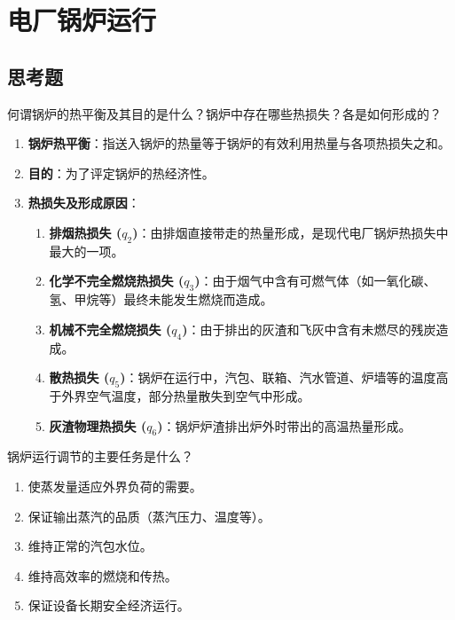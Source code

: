 \chapter{电厂锅炉运行}

\section{思考题}

\begin{problem}
何谓锅炉的热平衡及其目的是什么？锅炉中存在哪些热损失？各是如何形成的？
\end{problem}

\begin{solution}
\begin{enumerate}
  \item \textbf{锅炉热平衡}：指送入锅炉的热量等于锅炉的有效利用热量与各项热损失之和。
  \item \textbf{目的}：为了评定锅炉的热经济性。
  \item \textbf{热损失及形成原因}：
  \begin{enumerate}
    \item \textbf{排烟热损失 (\(q_{2}\))}：由排烟直接带走的热量形成，是现代电厂锅炉热损失中最大的一项。
    \item \textbf{化学不完全燃烧热损失 (\(q_{3}\))}：由于烟气中含有可燃气体（如一氧化碳、氢、甲烷等）最终未能发生燃烧而造成。
    \item \textbf{机械不完全燃烧损失 (\(q_{4}\))}：由于排出的灰渣和飞灰中含有未燃尽的残炭造成。
    \item \textbf{散热损失 (\(q_{5}\))}：锅炉在运行中，汽包、联箱、汽水管道、炉墙等的温度高于外界空气温度，部分热量散失到空气中形成。
    \item \textbf{灰渣物理热损失 (\(q_{6}\))}：锅炉炉渣排出炉外时带出的高温热量形成。
  \end{enumerate}
\end{enumerate}
\end{solution}

\begin{problem}
锅炉运行调节的主要任务是什么？
\end{problem}

\begin{solution}
\begin{enumerate}
  \item 使蒸发量适应外界负荷的需要。
  \item 保证输出蒸汽的品质（蒸汽压力、温度等）。
  \item 维持正常的汽包水位。
  \item 维持高效率的燃烧和传热。
  \item 保证设备长期安全经济运行。
\end{enumerate}
\end{solution}

